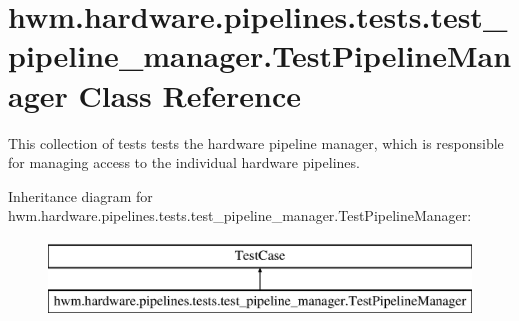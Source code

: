 \hypertarget{classhwm_1_1hardware_1_1pipelines_1_1tests_1_1test__pipeline__manager_1_1_test_pipeline_manager}{\section{hwm.\-hardware.\-pipelines.\-tests.\-test\-\_\-pipeline\-\_\-manager.\-Test\-Pipeline\-Manager Class Reference}
\label{classhwm_1_1hardware_1_1pipelines_1_1tests_1_1test__pipeline__manager_1_1_test_pipeline_manager}
}


This collection of tests tests the hardware pipeline manager, which is responsible for managing access to the individual hardware pipelines.  


Inheritance diagram for hwm.\-hardware.\-pipelines.\-tests.\-test\-\_\-pipeline\-\_\-manager.\-Test\-Pipeline\-Manager\-:\begin{figure}[H]
\begin{center}
\leavevmode
\includegraphics[height=2.000000cm]{classhwm_1_1hardware_1_1pipelines_1_1tests_1_1test__pipeline__manager_1_1_test_pipeline_manager}
\end{center}
\end{figure}
